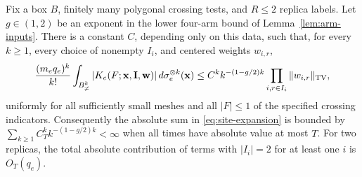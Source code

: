 \begin{proposition}
\label{prop:expansion-bound}
Fix a box $B$, finitely many polygonal crossing tests, and $R\leq2$
replica labels.  Let $g\in(1,2)$ be an exponent in the lower four-arm
bound of Lemma~\ref{lem:arm-inputs}.  There is a constant $C$, depending
only on this data, such that, for every $k\geq1$, every choice of
nonempty $I_i$, and centered weights $w_{i,r}$,
\begin{equation}
 \frac{(m_eq_e)^k}{k!}
   \int_{B^k_{\ne}}
       |K_e(F;\mathbf x,\mathbf I,\mathbf w)|
                    \,d\sigma_e^{\otimes k}(\mathbf x)
 \leq C^k k^{-(1-g/2)k}
             \prod_{i,r\in I_i}\|w_{i,r}\|_{\operatorname{TV}},
 \label{eq:coefficient-bound}
\end{equation}
uniformly for all sufficiently small meshes and all $|F|\leq1$ of the
specified crossing indicators.  Consequently the absolute sum in
\eqref{eq:site-expansion} is bounded by
$\sum_{k\geq1}C_T^k k^{-(1-g/2)k}<\infty$ when all times have absolute
value at most $T$.  For two replicas, the total absolute contribution
of terms with $|I_i|=2$ for at least one $i$ is $O_T(q_e)$.
\end{proposition}

